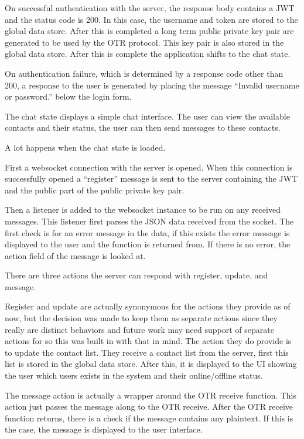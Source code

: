On successful authentication with the server, the response body contains a JWT and the status code is 200. In this case, the username and token are stored to the global data store. After this is completed a long term public private key pair are generated to be used by the OTR protocol. This key pair is also stored in the global data store. After this is complete the application shifts to the chat state.


On authentication failure, which is determined by a response code other than 200, a response to the user is generated by placing the message “Invalid username or password.” below the login form. 


The chat state displays a simple chat interface. The user can view the available contacts and their status, the user can then send messages to these contacts. 


A lot happens when the chat state is loaded. 


First a websocket connection with the server is opened. When this connection is successfully opened a “register” message is sent to the server containing the JWT and the public part of the public private key pair. 


Then a listener is added to the websocket instance to be run on any received messages. This listener first parses the JSON data received from the socket. The first check is for an error message in the data, if this exists the error message is displayed to the user and the function is returned from. If there is no error, the action field of the message is looked at. 


There are three actions the server can respond with register, update, and message.


Register and update are actually synonymous for the actions they provide as of now, but the decision was made to keep them as separate actions since they really are distinct behaviors and future work may need support of separate actions for so this was built in with that in mind. The action they do provide is to update the contact list. They receive a contact list from the server, first this list is stored in the global data store. After this, it is displayed to the UI showing the user which users exists in the system and their online/offline status.


The message action is actually a wrapper around the OTR receive function. This action just passes the message along to the OTR receive. After the OTR receive function returns, there is a check if the message contains any plaintext. If this is the case, the message is displayed to the user interface.


